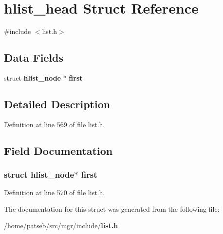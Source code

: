 \section{hlist\-\_\-head Struct Reference}
\label{structhlist__head}


{\ttfamily \#include $<$list.\-h$>$}

\subsection*{Data Fields}
\begin{DoxyCompactItemize}
\item 
struct {\bf hlist\-\_\-node} $\ast$ {\bf first}
\end{DoxyCompactItemize}


\subsection{Detailed Description}


Definition at line 569 of file list.\-h.



\subsection{Field Documentation}
\subsubsection[{first}]{\setlength{\rightskip}{0pt plus 5cm}struct {\bf hlist\-\_\-node}$\ast$ {\bf first}}\label{structhlist__head_acc2a65cc3e97d0e654f4c744bddfb96b}


Definition at line 570 of file list.\-h.



The documentation for this struct was generated from the following file\-:\begin{DoxyCompactItemize}
\item 
/home/patseb/src/mgr/include/{\bf list.\-h}\end{DoxyCompactItemize}
